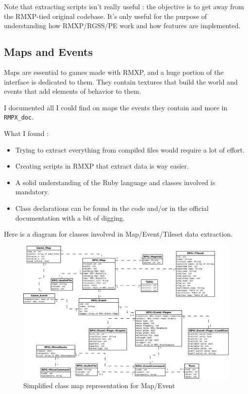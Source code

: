 \documentclass[11pt]{article}
\begin{document}
Note that extracting scripts isn't really useful : the objective is to get away from the RMXP-tied original codebase. It's only useful for the purpose of understanding how RMXP/RGSS/PE work and how features are implemented.


\subsection{Maps and Events}

Maps are essential to games made with RMXP, and a huge portion of the interface is dedicated to them. They contain textures that build the world and events that add elements of behavior to them.

I documented all I could find on maps the events they contain and more in \verb|RMPX_doc|.

What I found :
\begin{itemize}
	\item Trying to extract everything from compiled files would require a lot of effort.
	
	\item Creating scripts in RMXP that extract data is way easier.
	
	\item A solid understanding of the Ruby language and classes involved is mandatory.
	
	\item Class declarations can be found in the code and/or in the official documentation with a bit of digging.
\end{itemize}

\vspace{4mm}
Here is a diagram for classes involved in Map/Event/Tileset data extraction.
\begin{figure}[!h]
	\centering
	\includegraphics[width=\linewidth]{RMXP_full}
	\caption{Simplified class map representation for Map/Event}
	
\end{figure}
\end{document}
